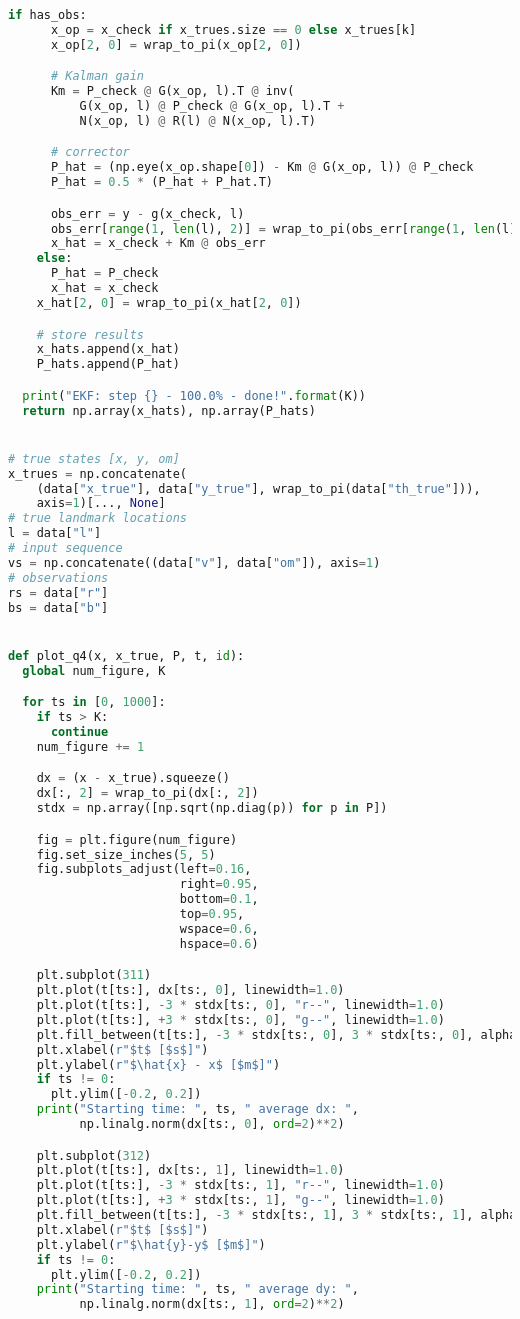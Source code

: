 \documentclass[a4paper]{article}
\begin{document}
\begin{lstlisting}[language=Python, basicstyle=\small]
    if has_obs:
      x_op = x_check if x_trues.size == 0 else x_trues[k]
      x_op[2, 0] = wrap_to_pi(x_op[2, 0])

      # Kalman gain
      Km = P_check @ G(x_op, l).T @ inv(
          G(x_op, l) @ P_check @ G(x_op, l).T +
          N(x_op, l) @ R(l) @ N(x_op, l).T)

      # corrector
      P_hat = (np.eye(x_op.shape[0]) - Km @ G(x_op, l)) @ P_check
      P_hat = 0.5 * (P_hat + P_hat.T)

      obs_err = y - g(x_check, l)
      obs_err[range(1, len(l), 2)] = wrap_to_pi(obs_err[range(1, len(l), 2)])
      x_hat = x_check + Km @ obs_err
    else:
      P_hat = P_check
      x_hat = x_check
    x_hat[2, 0] = wrap_to_pi(x_hat[2, 0])

    # store results
    x_hats.append(x_hat)
    P_hats.append(P_hat)

  print("EKF: step {} - 100.0% - done!".format(K))
  return np.array(x_hats), np.array(P_hats)


# true states [x, y, om]
x_trues = np.concatenate(
    (data["x_true"], data["y_true"], wrap_to_pi(data["th_true"])),
    axis=1)[..., None]
# true landmark locations
l = data["l"]
# input sequence
vs = np.concatenate((data["v"], data["om"]), axis=1)
# observations
rs = data["r"]
bs = data["b"]


def plot_q4(x, x_true, P, t, id):
  global num_figure, K

  for ts in [0, 1000]:
    if ts > K:
      continue
    num_figure += 1

    dx = (x - x_true).squeeze()
    dx[:, 2] = wrap_to_pi(dx[:, 2])
    stdx = np.array([np.sqrt(np.diag(p)) for p in P])

    fig = plt.figure(num_figure)
    fig.set_size_inches(5, 5)
    fig.subplots_adjust(left=0.16,
                        right=0.95,
                        bottom=0.1,
                        top=0.95,
                        wspace=0.6,
                        hspace=0.6)

    plt.subplot(311)
    plt.plot(t[ts:], dx[ts:, 0], linewidth=1.0)
    plt.plot(t[ts:], -3 * stdx[ts:, 0], "r--", linewidth=1.0)
    plt.plot(t[ts:], +3 * stdx[ts:, 0], "g--", linewidth=1.0)
    plt.fill_between(t[ts:], -3 * stdx[ts:, 0], 3 * stdx[ts:, 0], alpha=0.2)
    plt.xlabel(r"$t$ [$s$]")
    plt.ylabel(r"$\hat{x} - x$ [$m$]")
    if ts != 0:
      plt.ylim([-0.2, 0.2])
    print("Starting time: ", ts, " average dx: ",
          np.linalg.norm(dx[ts:, 0], ord=2)**2)

    plt.subplot(312)
    plt.plot(t[ts:], dx[ts:, 1], linewidth=1.0)
    plt.plot(t[ts:], -3 * stdx[ts:, 1], "r--", linewidth=1.0)
    plt.plot(t[ts:], +3 * stdx[ts:, 1], "g--", linewidth=1.0)
    plt.fill_between(t[ts:], -3 * stdx[ts:, 1], 3 * stdx[ts:, 1], alpha=0.2)
    plt.xlabel(r"$t$ [$s$]")
    plt.ylabel(r"$\hat{y}-y$ [$m$]")
    if ts != 0:
      plt.ylim([-0.2, 0.2])
    print("Starting time: ", ts, " average dy: ",
          np.linalg.norm(dx[ts:, 1], ord=2)**2)


\end{lstlisting}
\end{document}
